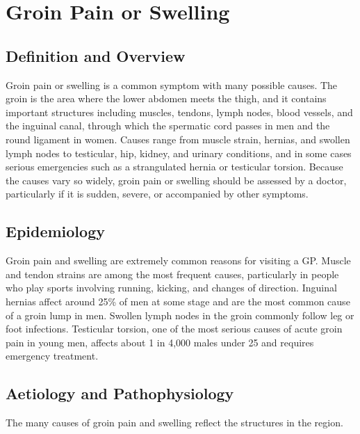 \chapter{Groin Pain or Swelling}

\section*{Definition and Overview}
Groin pain or swelling is a common symptom with many possible causes. The groin is the area where the lower abdomen meets the thigh, and it contains important structures including muscles, tendons, lymph nodes, blood vessels, and the inguinal canal, through which the spermatic cord passes in men and the round ligament in women. Causes range from muscle strain, hernias, and swollen lymph nodes to testicular, hip, kidney, and urinary conditions, and in some cases serious emergencies such as a strangulated hernia or testicular torsion. Because the causes vary so widely, groin pain or swelling should be assessed by a doctor, particularly if it is sudden, severe, or accompanied by other symptoms.

\section*{Epidemiology}
Groin pain and swelling are extremely common reasons for visiting a GP. Muscle and tendon strains are among the most frequent causes, particularly in people who play sports involving running, kicking, and changes of direction. Inguinal hernias affect around 25\% of men at some stage and are the most common cause of a groin lump in men. Swollen lymph nodes in the groin commonly follow leg or foot infections. Testicular torsion, one of the most serious causes of acute groin pain in young men, affects about 1 in 4,000 males under 25 and requires emergency treatment.

\section*{Aetiology and Pathophysiology}
The many causes of groin pain and swelling reflect the structures in the region.

